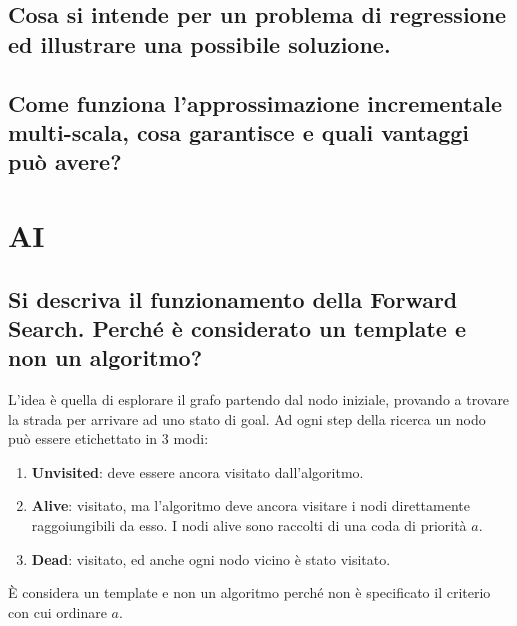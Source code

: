 \documentclass[\main/main.tex]{subfiles}
\begin{document}
\subsection{Cosa si intende per un problema di regressione ed illustrare una possibile soluzione.}
\subsection{Come funziona l'approssimazione incrementale multi-scala, cosa garantisce e quali vantaggi può avere?}

\clearpage
\section{AI}

\subsection{Si descriva il funzionamento della Forward Search.  Perché è considerato un template e non un algoritmo?}
L'idea è quella di esplorare il grafo partendo dal nodo iniziale, provando a trovare la strada per arrivare ad uno stato di goal. Ad ogni step della ricerca un nodo può essere etichettato in 3 modi:

\begin{enumerate}
\item \textbf{Unvisited}: deve essere ancora visitato dall'algoritmo.
\item \textbf{Alive}: visitato, ma l'algoritmo deve ancora visitare i nodi direttamente raggoiungibili da esso. I nodi alive sono raccolti di una coda di priorità $a$.
\item \textbf{Dead}: visitato, ed anche ogni nodo vicino è stato visitato.
\end{enumerate}

È considera un template e non un algoritmo perché non è specificato il criterio con cui ordinare $a$.
\end{document}
